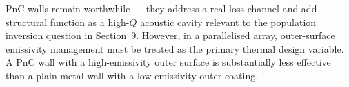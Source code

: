 \documentclass[12pt]{article}
\begin{document}
\noindent
PnC walls remain worthwhile — they address a real loss channel and add
structural function as a high-$Q$ acoustic cavity relevant to the population
inversion question in Section~9. However, in a parallelised array, outer-surface
emissivity management must be treated as the primary thermal design variable.
A PnC wall with a high-emissivity outer surface is substantially less effective
than a plain metal wall with a low-emissivity outer coating.
\end{document}
